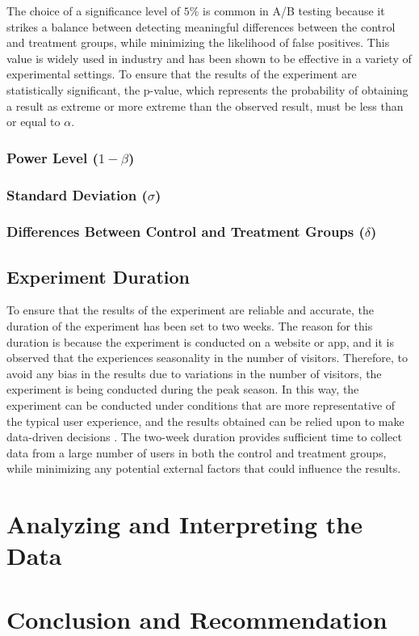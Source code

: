 \documentclass{article}
\begin{document}
The choice of a significance level of $5\%$ is common in A/B testing because it strikes a balance between detecting meaningful differences between the control and treatment groups, while minimizing the likelihood of false positives. This value is widely used in industry and has been shown to be effective in a variety of experimental settings. To ensure that the results of the experiment are statistically significant, the p-value, which represents the probability of obtaining a result as extreme or more extreme than the observed result, must be less than or equal to $\alpha$.

\subsubsection*{Power Level ($1-\beta$)} \par

\subsubsection*{Standard Deviation ($\sigma$)} \par

\subsubsection*{Differences Between Control and Treatment Groups ($\delta$)} \par

\subsection*{Experiment Duration} \par

To ensure that the results of the experiment are reliable and accurate, the duration of the experiment has been set to two weeks. The reason for this duration is because the experiment is conducted on a website or app, and it is observed that the experiences seasonality in the number of visitors. Therefore, to avoid any bias in the results due to variations in the number of visitors, the experiment is being conducted during the peak season. In this way, the experiment can be conducted under conditions that are more representative of the typical user experience, and the results obtained can be relied upon to make data-driven decisions \cite{saleh_2017_how}. The two-week duration provides sufficient time to collect data from a large number of users in both the control and treatment groups, while minimizing any potential external factors that could influence the results.


\section{Analyzing and Interpreting the Data} \par

\section{Conclusion and Recommendation} \par

\printbibliography %
\end{document}
